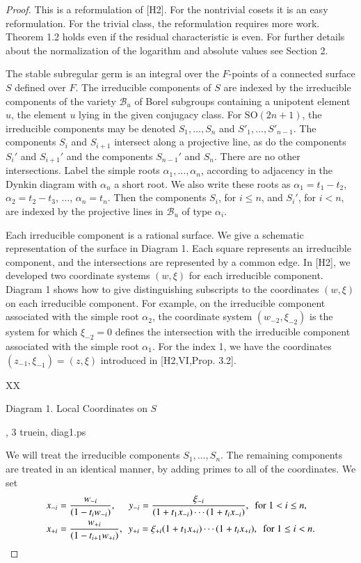 \documentclass{amsart}
\def\diabox#1#2#3{#1, #2, #3}
\begin{document}
\medskip
\noindent
\begin{proof}  This is a  reformulation of [H2].  For the nontrivial
cosets it is an easy reformulation.  For the trivial class, the
reformulation requires more work.  Theorem 1.2 holds even if the
residual characteristic is even.  For further details about the
normalization of the logarithm and absolute values see Section 2.

The
stable subregular germ is an integral over the $F$-points
of a connected surface $S$ defined over $F$.  The 
irreducible components of $S$ are indexed by the irreducible components
of the variety ${\mathcal B}_u$ of Borel subgroups containing
a unipotent element $u$,  the element $u$ lying in the
given conjugacy class.
For $\text{SO}(2n+1)$, the irreducible components may be denoted
$S_1,\ldots,S_n$ and $S'_1,\ldots,S'_{n-1}$.  The 
components $S_i$ and $S_{i+1}$ intersect along a projective
line, as do the components $S_i'$ and $S_{i+1}'$ and
the components $S_{n-1}'$ and $S_n$.  There are no other intersections.
Label the simple roots $\alpha_1,\ldots,\alpha_n$,
according to adjacency in the Dynkin diagram with $\alpha_n$ a
short root. We also write these roots as $\alpha_1=t_1-t_2$,
$\alpha_2=t_2-t_3$, $\ldots$, $\alpha_n = t_n$.
Then
the components $S_i$, for $i\le n$, and $S_i'$,
for $i<n$, are indexed by the projective lines
in ${\mathcal B}_u$
of type $\alpha_i$. 



Each irreducible component is a rational surface.  
We give a schematic representation of the surface
in Diagram 1.  Each square represents an irreducible component,
and the intersections are represented by a common edge.  In
[H2], we developed two coordinate systems $(w,\xi)$ for each
irreducible component.  Diagram 1 shows how to give
distinguishing subscripts to the coordinates $(w,\xi)$ on
each irreducible component.  For example, on the irreducible component
associated with the simple root $\alpha_2$, the coordinate
system $(w_{-2},\xi_{-2})$ is the system for which
$\xi_{-2}=0$ defines the intersection with the irreducible
component associated with the simple root $\alpha_1$.
For the index 1, we have the coordinates
$(z_{-1},\xi_{-1})=(z,\xi)$ 
introduced in [H2,VI,Prop. 3.2].

\medskip

\diabox{XX \centerline{Diagram 1.  Local Coordinates on $S$}}{3 truein}{diag1.ps}

\medskip

We will treat the irreducible components $S_1,\ldots,S_n$.
The remaining components are treated in an identical manner,
by adding primes to all of the coordinates.  We set
\begin{align*}
x_{-i} &= {w_{-i}\over (1-t_i w_{-i} )},\ \ \ \ \,\,
y_{-i}  = {\xi_{-i}\over
  (1+t_1 x_{-i} )\cdots (1+t_i x_{-i} )},\ \text{ for }1<i\le n,\\
x_{+i} &= {w_{+i}\over (1-t_{i+1} w_{+i})},\ \ 
y_{+i} = {\xi_{+i} (1+t_1 x_{+i})\cdots (1+t_i x_{+i})},\ \text{ for }
 1\le i<n.\\
\end{align*}


\end{proof}
\end{document}
